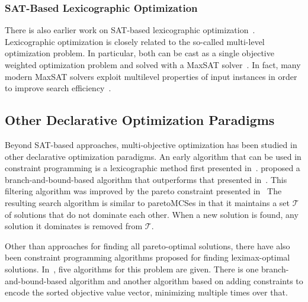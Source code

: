 \subsubsection{SAT-Based Lexicographic Optimization\label{sec:lex-opt}}

There is also earlier work on SAT-based lexicographic optimization~\autocite{DBLP:journals/ors/EhrgottG00,DBLP:conf/ijcai/ArgelichLS09,DBLP:journals/amai/Marques-SilvaAGL11}. 
Lexicographic optimization is closely related to the so-called multi-level optimization problem.
In particular, both can be cast as a single objective weighted optimization problem and solved with a MaxSAT solver~\autocite{DBLP:conf/ijcai/ArgelichLS09,DBLP:journals/amai/Marques-SilvaAGL11}.
In fact, many modern MaxSAT solvers exploit multilevel properties of input instances in order to improve search efficiency~\autocite{DBLP:conf/vmcai/PaxianRB21,DBLP:conf/cp/AnsoteguiBGL12}.

\subsection{Other Declarative Optimization Paradigms\label{sec:other-approaches}}

Beyond SAT-based approaches, multi-objective optimization has been studied in other declarative optimization paradigms.
An early algorithm that can be used in constraint programming is a lexicographic method first presented in~\textcite{Wassenhove1980}.
\Textcite{DBLP:conf/ecai/Gavanelli02} proposed a branch-and-bound-based algorithm that outperforms that presented in~\textcite{Wassenhove1980}.
This filtering algorithm was improved by the pareto constraint presented in~\textcite{DBLP:conf/cp/SchausH13,DBLP:conf/aaai/HartertS14}
The resulting search algorithm is similar to paretoMCSes in that it maintains a set $\mathcal{T}$ of solutions that do not dominate each other.
When a new solution is found, any solution it dominates is removed from $\mathcal{T}$.

Other than approaches for finding all pareto-optimal solutions, there have also been constraint programming algorithms proposed for finding leximax-optimal solutions.
In~\textcite{DBLP:journals/ai/BouveretL09}, five algorithms for this problem are given.
There is one branch-and-bound-based algorithm and another algorithm based on adding constraints to encode the sorted objective value vector, minimizing multiple times over that.

